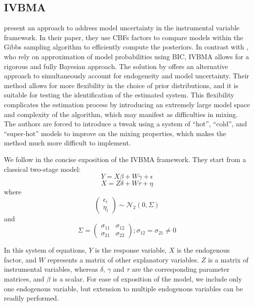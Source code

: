 \documentclass[a4paper,11pt]{article}
\begin{document}
\subsection*{\ac{IVBMA}}
\citet{KarlLenkoski2012} present an approach to address model uncertainty in the instrumental variable framework. In their paper, they use \acp{CBF} factors to compare models within the Gibbs sampling algorithm to efficiently compute the posteriors. In contrast with \citet{lenkoski2014two}, who rely on approximation of model probabilities using \ac{BIC}, \ac{IVBMA} allows for a rigorous and fully Bayesian approach. The solution by \citet{koop2012bayesian} offers an alternative approach to simultaneously account for endogeneity and model uncertainty. Their method allows for more flexibility in the choice of prior distributions, and it is suitable for testing the identification of the estimated system. This flexibility complicates the estimation process by introducing an extremely large model space and complexity of the algorithm, which may manifest as difficulties in mixing. The authors are forced to introduce a tweak using a system of ``hot'', ``cold'', and ``super-hot'' models to improve on the mixing properties, which makes the method much more difficult to implement.

We follow \citet{KarlLenkoski2012} in the concise exposition of the \ac{IVBMA} framework. They start from a classical two-stage model:
\begin{equation}
\label{eq:ivbma1}
{Y} = {X} \beta + {W} \gamma + {\epsilon}
\end{equation}
%
\begin{equation}
\label{eq:ivbma2}
{X} = {Z} {\delta} + {W} {\tau} + {\eta}
\end{equation}
%
where
%
\begin{equation}
\begin{pmatrix}
\epsilon_{i} \\
\eta_{i}
\end{pmatrix}
\sim \mathcal{N}_{2}(0, {\Sigma})
\end{equation}
%
and
%
\begin{equation}
{\Sigma} = 
\begin{pmatrix}
 \sigma_{11} & \sigma_{12} \\
 \sigma_{21} & \sigma_{22}
\end{pmatrix}
; \sigma_{12} = \sigma_{21} \neq 0
\end{equation}

In this system of equations, ${Y}$ is the response variable, ${X}$ is the endogenous factor, and ${W}$ represents a matrix of other explanatory variables. ${Z}$ is a matrix of instrumental variables, whereas ${\delta}$, ${\gamma}$ and ${\tau}$ are the corresponding parameter matrices, and $\beta$ is a scalar. For ease of exposition of the model, we include only one endogenous variable, but extension to multiple endogenous variables can be readily performed.
\end{document}
